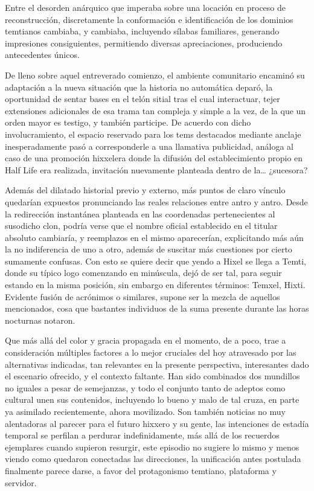 \documentclass[
]{book}
\begin{document}
Entre el desorden anárquico que imperaba sobre una locación en proceso de reconstrucción, discretamente la conformación e identificación de los dominios temtianos cambiaba, y cambiaba, incluyendo sílabas familiares, generando impresiones consiguientes, permitiendo diversas apreciaciones, produciendo antecedentes únicos.

De lleno sobre aquel entreverado comienzo, el ambiente comunitario encaminó su adaptación a la nueva situación que la historia no automática deparó, la oportunidad de sentar bases en el telón sitial tras el cual interactuar, tejer extensiones adicionales de esa trama tan compleja y simple a la vez, de la que un orden mayor es testigo, y también participe. De acuerdo con dicho involucramiento, el espacio reservado para los tems destacados mediante anclaje inesperadamente pasó a corresponderle a una llamativa publicidad, análoga al caso de una promoción hixxelera donde la difusión del establecimiento propio en Half Life era realizada, invitación nuevamente planteada dentro de la\ldots{} ¿sucesora?

Además del dilatado historial previo y externo, más puntos de claro vínculo quedarían expuestos pronunciando las reales relaciones entre antro y antro. Desde la redirección instantánea planteada en las coordenadas pertenecientes al susodicho clon, podría verse que el nombre oficial establecido en el titular absoluto cambiaría, y reemplazos en el mismo aparecerían, explicitando más aún la no indiferencia de uno a otro, además de suscitar más cuestiones por cierto sumamente confusas. Con esto se quiere decir que yendo a Hixel se llega a Temti, donde su típico logo comenzando en minúscula, dejó de ser tal, para seguir estando en la misma posición, sin embargo en diferentes términos: Temxel, Hixti. Evidente fusión de acrónimos o similares, supone ser la mezcla de aquellos mencionados, cosa que bastantes individuos de la suma presente durante las horas nocturnas notaron.

Que más allá del color y gracia propagada en el momento, de a poco, trae a consideración múltiples factores a lo mejor cruciales del hoy atravesado por las alternativas indicadas, tan relevantes en la presente perspectiva, interesantes dado el escenario ofrecido, y el contexto faltante. Han sido combinados dos mundillos no iguales a pesar de semejanzas, y todo el conjunto tanto de adeptos como cultural unen sus contenidos, incluyendo lo bueno y malo de tal cruza, en parte ya asimilado recientemente, ahora movilizado. Son también noticias no muy alentadoras al parecer para el futuro hixxero y su gente, las intenciones de estadía temporal se perfilan a perdurar indefinidamente, más allá de los recuerdos ejemplares cuando supieron resurgir, este episodio no sugiere lo mismo y menos viendo como quedaron conectadas las direcciones, la unificación antes postulada finalmente parece darse, a favor del protagonismo temtiano, plataforma y servidor.
\end{document}
